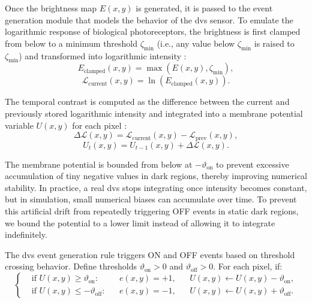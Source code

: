 Once the brightness map $E(x,y)$ is generated, it is passed to the event generation module that models the behavior of the \ac{dvs} sensor. To emulate the logarithmic response of biological photoreceptors, the brightness is first clamped from below to a minimum threshold $\zeta_{\min}$ (i.e., any value below $\zeta_{\min}$ is raised to $\zeta_{\min}$) and transformed into logarithmic intensity \cite{9138762}:
\begin{equation}
E_{\text{clamped}}(x,y) = \max(E(x,y), \zeta_{\min}), 
\end{equation}
\begin{equation}
\mathcal{L}_{\text{current}}(x,y) = \ln(E_{\text{clamped}}(x,y)).
\end{equation}

The temporal contrast is computed as the difference between the current and previously stored logarithmic intensity and integrated into a membrane potential variable $U(x,y)$ for each pixel \cite{graca2025towards}:
\begin{equation}
\Delta \mathcal{L}(x,y) = \mathcal{L}_{\text{current}}(x,y) - \mathcal{L}_{\text{prev}}(x,y),
\end{equation}
\begin{equation}
U_t(x,y) = U_{t-1}(x,y) + \Delta \mathcal{L}(x,y).
\end{equation}

The membrane potential is bounded from below at $-\vartheta_{\text{on}}$ to prevent excessive accumulation of tiny negative values in dark regions, thereby improving numerical stability. In practice, a real \ac{dvs} stops integrating once intensity becomes constant, but in simulation, small numerical biases can accumulate over time. To prevent this artificial drift from repeatedly triggering OFF events in static dark regions, we bound the potential to a lower limit instead of allowing it to integrate indefinitely.

The \ac{dvs} event generation rule triggers ON and OFF events based on threshold crossing behavior. Define thresholds $\vartheta_{\text{on}} > 0$ and $\vartheta_{\text{off}} > 0$. For each pixel, if:
\begin{equation}
\left\{
\begin{aligned}
&\text{if } U(x,y) \geq \vartheta_{\text{on}}: 
&& e(x,y) = +1, 
&& U(x,y) \leftarrow U(x,y) - \vartheta_{\text{on}}, \\
&\text{if } U(x,y) \leq -\vartheta_{\text{off}}: 
&& e(x,y) = -1, 
&& U(x,y) \leftarrow U(x,y) + \vartheta_{\text{off}}.
\end{aligned}
\right.
\end{equation}


